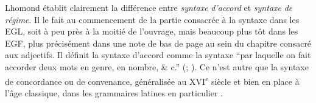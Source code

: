 \documentclass[output=paper]{langsci/langscibook}
\begin{document}
Lhomond établit clairement la différence entre \textit{syntaxe} \textit{d’accord} et \textit{syntaxe} \textit{de} \textit{régime}. Il le fait au commencement de la partie consacrée à la syntaxe dans les EGL, soit à peu près à la moitié de l’ouvrage, mais beaucoup plus tôt dans les EGF, plus précisément dans une note de bas de page au sein du chapitre consacré aux adjectifs. Il définit la syntaxe d’accord comme la syntaxe “par laquelle on fait accorder deux mots en genre, en nombre, \& c.” (\citealt[15]{lhomond_elemens_1790}; \citealt[131]{lhomond_elemens_1781}). Ce n’est autre que la syntaxe de concordance ou de convenance, généralisée au XVI\textsuperscript{e} siècle et bien en place à l’âge classique, dans les grammaires latines en particulier \citep{colombat_grammaire_1999}. 
\end{document}

